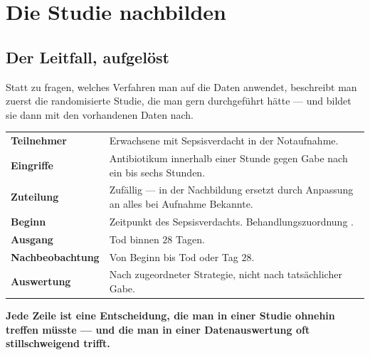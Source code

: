 \chapter{Die Studie nachbilden}

\section{Der Leitfall, aufgelöst}

\begin{merksatz}
Statt zu fragen, welches Verfahren man auf die Daten anwendet, beschreibt man zuerst die randomisierte Studie, die man gern durchgeführt hätte --- und bildet sie dann mit den vorhandenen Daten nach.

\begin{center}
{\small
\renewcommand{\arraystretch}{1.55}
\begin{tabular}{@{}P{3.0cm}P{5.6cm}@{}}
\toprule
\textbf{Teilnehmer} & Erwachsene mit Sepsisverdacht in der Notaufnahme.\\
\textbf{Eingriffe} & Antibiotikum innerhalb einer Stunde gegen Gabe nach ein bis sechs Stunden.\\
\textbf{Zuteilung} & Zufällig --- in der Nachbildung ersetzt durch Anpassung an alles bei Aufnahme Bekannte.\\
\textbf{Beginn} & Zeitpunkt des Sepsisverdachts. Behandlungszuordnung .\\
\textbf{Ausgang} & Tod binnen $28$ Tagen.\\
\textbf{Nachbeobachtung} & Von Beginn bis Tod oder Tag $28$.\\
\textbf{Auswertung} & Nach zugeordneter Strategie, nicht nach tatsächlicher Gabe.\\
\bottomrule
\end{tabular}}
\end{center}

\begin{center}
\begin{minipage}{0.9\textwidth}
\textbf{Jede Zeile ist eine Entscheidung, die man in einer Studie ohnehin treffen müsste --- und die man in einer Datenauswertung oft stillschweigend trifft.}
\end{minipage}
\end{center}

\begin{center}
\begin{minipage}{0.88\textwidth}
\end{minipage}
\end{center}
\end{merksatz}

